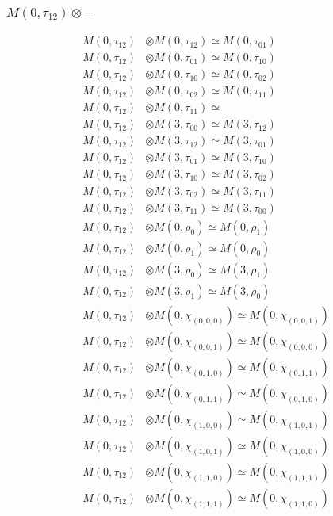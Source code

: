\subsubsection{$ M(0,\tau_{12})\otimes -$}
\begin{align*}
M(0,\tau_{12}) &\otimes M(0,\tau_{12}) \simeq M(0,\tau_{01}) \\
M(0,\tau_{12}) &\otimes M(0,\tau_{01}) \simeq M(0,\tau_{10}) \\
M(0,\tau_{12}) &\otimes M(0,\tau_{10}) \simeq M(0,\tau_{02}) \\
M(0,\tau_{12}) &\otimes M(0,\tau_{02}) \simeq M(0,\tau_{11}) \\
M(0,\tau_{12}) &\otimes M(0,\tau_{11}) \simeq  \\
M(0,\tau_{12}) &\otimes M(3,\tau_{00}) \simeq M(3,\tau_{12}) \\
M(0,\tau_{12}) &\otimes M(3,\tau_{12}) \simeq M(3,\tau_{01}) \\
M(0,\tau_{12}) &\otimes M(3,\tau_{01}) \simeq M(3,\tau_{10}) \\
M(0,\tau_{12}) &\otimes M(3,\tau_{10}) \simeq M(3,\tau_{02}) \\
M(0,\tau_{12}) &\otimes M(3,\tau_{02}) \simeq M(3,\tau_{11}) \\
M(0,\tau_{12}) &\otimes M(3,\tau_{11}) \simeq M(3,\tau_{00}) \\
M(0,\tau_{12}) &\otimes M(0,\rho_{0}) \simeq M(0,\rho_{1}) \\
M(0,\tau_{12}) &\otimes M(0,\rho_{1}) \simeq M(0,\rho_{0}) \\
M(0,\tau_{12}) &\otimes M(3,\rho_{0}) \simeq M(3,\rho_{1}) \\
M(0,\tau_{12}) &\otimes M(3,\rho_{1}) \simeq M(3,\rho_{0}) \\
M(0,\tau_{12}) &\otimes M(0,\chi_{(0,0,0)}) \simeq M(0,\chi_{(0,0,1)}) \\
M(0,\tau_{12}) &\otimes M(0,\chi_{(0,0,1)}) \simeq M(0,\chi_{(0,0,0)}) \\
M(0,\tau_{12}) &\otimes M(0,\chi_{(0,1,0)}) \simeq M(0,\chi_{(0,1,1)}) \\
M(0,\tau_{12}) &\otimes M(0,\chi_{(0,1,1)}) \simeq M(0,\chi_{(0,1,0)}) \\
M(0,\tau_{12}) &\otimes M(0,\chi_{(1,0,0)}) \simeq M(0,\chi_{(1,0,1)}) \\
M(0,\tau_{12}) &\otimes M(0,\chi_{(1,0,1)}) \simeq M(0,\chi_{(1,0,0)}) \\
M(0,\tau_{12}) &\otimes M(0,\chi_{(1,1,0)}) \simeq M(0,\chi_{(1,1,1)}) \\
M(0,\tau_{12}) &\otimes M(0,\chi_{(1,1,1)}) \simeq M(0,\chi_{(1,1,0)}) \\

\end{align*}
